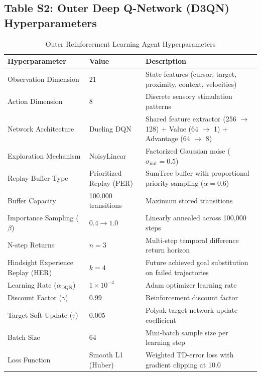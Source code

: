 \documentclass[utf8]{frontiers_suppmat}
\begin{document}
\subsection{Table S2: Outer Deep Q-Network (D3QN) Hyperparameters}

\begin{table}[htbp]
\centering
\small
\renewcommand{\arraystretch}{1.2}
\caption{Outer Reinforcement Learning Agent Hyperparameters}
\label{tab:rl_params}
\begin{tabularx}{\linewidth}{l l X}
\toprule
\textbf{Hyperparameter} & \textbf{Value} & \textbf{Description} \\
\midrule
Observation Dimension & 21 & State features (cursor, target, proximity, context, velocities) \\
Action Dimension & 8 & Discrete sensory stimulation patterns \\
Network Architecture & Dueling DQN & Shared feature extractor (256 $\to$ 128) + Value (64 $\to$ 1) + Advantage (64 $\to$ 8) \\
Exploration Mechanism & NoisyLinear & Factorized Gaussian noise ($\sigma_{\text{init}} = 0.5$) \\
Replay Buffer Type & Prioritized Replay (PER) & SumTree buffer with proportional priority sampling ($\alpha = 0.6$) \\
Buffer Capacity & 100,000 transitions & Maximum stored transitions \\
Importance Sampling ($\beta$) & $0.4 \to 1.0$ & Linearly annealed across 100,000 steps \\
N-step Returns & $n = 3$ & Multi-step temporal difference return horizon \\
Hindsight Experience Replay (HER) & $k = 4$ & Future achieved goal substitution on failed trajectories \\
Learning Rate ($\alpha_{\text{DQN}}$) & $1 \times 10^{-4}$ & Adam optimizer learning rate \\
Discount Factor ($\gamma$) & 0.99 & Reinforcement discount factor \\
Target Soft Update ($\tau$) & 0.005 & Polyak target network update coefficient \\
Batch Size & 64 & Mini-batch sample size per learning step \\
Loss Function & Smooth L1 (Huber) & Weighted TD-error loss with gradient clipping at 10.0 \\
\bottomrule
\end{tabularx}
\end{table}
\end{document}
